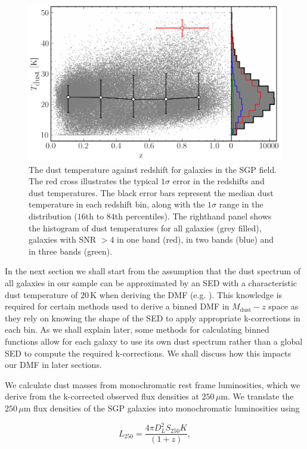 \begin{figure}
	\centering
	\includegraphics[width=0.75\columnwidth]{Figures/dust_temperatures.pdf}
	\caption[The distribution of dust temperatures as a function of redshift]{The dust temperature against redshift for galaxies in the SGP field. The red cross illustrates the typical $1\sigma$ error in the redshifts and dust temperatures. The black error bars represent the median dust temperature in each redshift bin, along with the $1\sigma$ range in the distribution ($16$th to $84$th percentiles). The righthand panel shows the histogram of dust temperatures for all galaxies (grey filled), galaxies with SNR $> 4$ in one band (red), in two bands (blue) and in three bands (green).}
	\label{fig:dust_temperatures}
\end{figure}

In the next section we shall start from the assumption that the dust spectrum of all galaxies in our sample can be approximated by an SED with a characteristic dust temperature of $20\,$K when deriving the DMF (e.g. \citealt{Vlahakis_2005}). This knowledge is required for certain methods used to derive a binned DMF in $M_{\textrm{dust}}-z$ space as they rely on knowing the shape of the SED to apply appropriate k-corrections in each bin. As we shall explain later, some methods for calculating binned functions allow for each galaxy to use its own dust spectrum rather than a global SED to compute the required k-corrections. We shall discuss how this impacts our DMF in later sections.

We calculate dust masses from monochromatic rest frame luminosities, which we derive from the k-corrected observed flux densities at $250\,\mu$m. We translate the $250\,\mu$m flux densities of the SGP galaxies into monochromatic luminosities using

\begin{equation}
    L_{250} = \frac{4\pi D_L^2 S_{250}K}{(1+z)},
\label{eq:monohromatic_luminosities}
\end{equation}

